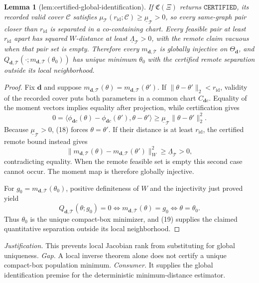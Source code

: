 \documentclass{article}
\newtheorem{lemma}{Lemma}
\begin{document}
\begin{lemma}[lem:certified-global-identification]\label{lem:certified-global-identification}
If \(\mathfrak C(\Xi)\) returns \(\mathtt{CERTIFIED}\), its recorded valid cover \(\mathscr C\) satisfies \(\mu_{\mathcal T}(r_{\mathrm{id}};\mathscr C)\geq\underline\mu_{\mathcal T}>0\), so every same-graph pair closer than \(r_{\mathrm{id}}\) is separated in a co-containing chart. Every feasible pair at least \(r_{\mathrm{id}}\) apart has squared \(W\)-distance at least \(\underline\Lambda_{\mathcal T}>0\), with the remote claim vacuous when that pair set is empty. Therefore every \(m_{\boldsymbol d,\mathcal T}\) is globally injective on \(\Theta_{\boldsymbol d}\), and \(Q_{\boldsymbol d,\mathcal T}(\cdot;m_{\boldsymbol d,\mathcal T}(\theta_0))\) has unique minimum \(\theta_0\) with the certified remote separation outside its local neighborhood.
\end{lemma}
\begin{proof}
Fix \(\boldsymbol d\) and suppose
\(m_{\boldsymbol d,\mathcal T}(\theta)=m_{\boldsymbol d,\mathcal T}(\theta')\).  If \(\|\theta-\theta'\|_2<r_{\mathrm{id}}\), validity of the recorded cover puts both parameters in a common chart \(C_{\boldsymbol d c}\).  Equality of the moment vectors implies equality after projection, while certification gives
\[
 0=\langle\phi_{\boldsymbol d c}(\theta)-
 \phi_{\boldsymbol d c}(\theta'),\theta-\theta'\rangle
 \geq \underline\mu_{\mathcal T}\|\theta-\theta'\|_2^2. \tag{18}
\]
Because \(\underline\mu_{\mathcal T}>0\), (18) forces \(\theta=\theta'\).  If their distance is at least \(r_{\mathrm{id}}\), the certified remote bound instead gives
\[
 \|m_{\boldsymbol d,\mathcal T}(\theta)-
 m_{\boldsymbol d,\mathcal T}(\theta')\|_W^2
 \geq\underline\Lambda_{\mathcal T}>0, \tag{19}
\]
contradicting equality.  When the remote feasible set is empty this second case cannot occur.  The moment map is therefore globally injective.

For \(g_0=m_{\boldsymbol d,\mathcal T}(\theta_0)\), positive definiteness of \(W\) and the injectivity just proved yield
\[
 Q_{\boldsymbol d,\mathcal T}(\theta;g_0)=0
 \Longleftrightarrow
 m_{\boldsymbol d,\mathcal T}(\theta)=g_0
 \Longleftrightarrow \theta=\theta_0. \tag{20}
\]
Thus \(\theta_0\) is the unique compact-box minimizer, and (19) supplies the claimed quantitative separation outside its local neighborhood.
\end{proof}
\par\smallskip\noindent \textit{Justification.} This prevents local Jacobian rank from substituting for global uniqueness. \textit{Gap.} A local inverse theorem alone does not certify a unique compact-box population minimum. \textit{Consumer.} It supplies the global identification premise for the deterministic minimum-distance estimator.
\end{document}
